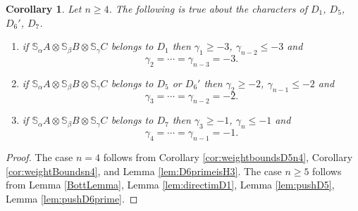 \documentclass[11pt,reqno]{amsart}
\newcommand{\oo}{\otimes}
\newcommand{\bS}{\mathbb{S}}
\newtheorem{corollary}[theorem]{Corollary}
\numberwithin{equation}{section}
\begin{document}
\begin{corollary}\label{cor:bottcorsimple}
Let $n\geq 4$. The following is true about the characters of $D_1$, $D_5$, $D_6'$, $D_7$. 
\begin{enumerate}
\item if $\bS_{\alpha}A\oo \bS_{\beta}B\oo \bS_{\gamma}C$ belongs to $D_1$ then $\gamma_1\geq -3$, $\gamma_{n-2}\leq -3$ and
$$
\gamma_2=\cdots =\gamma_{n-3}=-3.
$$
\item if $\bS_{\alpha}A\oo \bS_{\beta}B\oo \bS_{\gamma}C$ belongs to $D_5$ or $D_6'$ then $\gamma_2\geq -2$, $\gamma_{n-1}\leq -2$ and 
$$
\gamma_3=\cdots=\gamma_{n-2}=-2.
$$
\item if $\bS_{\alpha}A\oo \bS_{\beta}B\oo \bS_{\gamma}C$ belongs to $D_7$ then $\gamma_3\geq -1$, $\gamma_n\leq -1$ and
$$
\gamma_4=\cdots =\gamma_{n-1}=-1.
$$
\end{enumerate}

\end{corollary}

\begin{proof}
The case $n=4$ follows from Corollary \ref{cor:weightboundsD5n4}, Corollary \ref{cor:weightBoundsn4}, and Lemma \ref{lem:D6primeisH3}. The case $n\geq 5$ follows from Lemma \ref{BottLemma}, Lemma \ref{lem:directimD1}, Lemma \ref{lem:pushD5}, Lemma \ref{lem:pushD6prime}.	
\end{proof}
\end{document}
